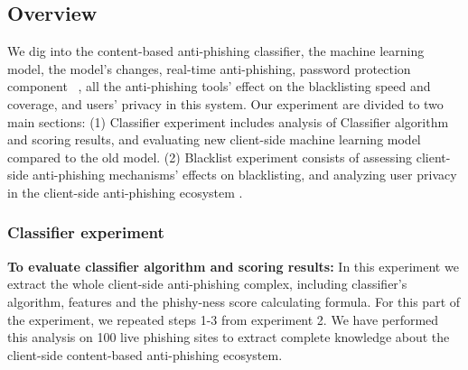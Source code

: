 \subsection{Overview}
We dig into the content-based anti-phishing classifier, the machine learning model, the model's changes, real-time anti-phishing, password protection component ~\cite{google-online-security-blog-2019}, all the anti-phishing tools' effect on the blacklisting speed and coverage, and users' privacy in this system.
Our experiment are divided to two main sections:
(1) Classifier experiment includes analysis of Classifier algorithm and scoring results, and evaluating new client-side machine learning model compared to the old model. (2) Blacklist experiment  consists of assessing client-side anti-phishing mechanisms' effects on blacklisting, and analyzing user privacy in the client-side anti-phishing ecosystem .
\subsubsection{Classifier experiment}
\textbf{To evaluate classifier algorithm and scoring results:}
In this experiment we extract the whole client-side anti-phishing complex, including classifier's algorithm, features and the phishy-ness score calculating formula. For this part of the experiment, we repeated steps 1-3 from experiment 2.
We have performed this analysis on 100 live phishing sites to extract complete knowledge about the client-side content-based anti-phishing ecosystem. 

